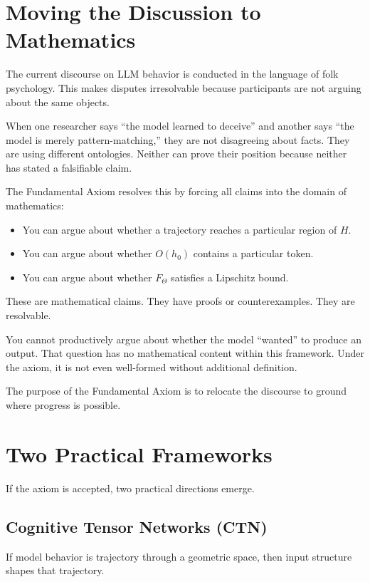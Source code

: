 \documentclass[11pt,a4paper]{article}
\begin{document}
\section{Moving the Discussion to Mathematics}

The current discourse on LLM behavior is conducted in the language of folk psychology. This makes disputes irresolvable because participants are not arguing about the same objects.

When one researcher says ``the model learned to deceive'' and another says ``the model is merely pattern-matching,'' they are not disagreeing about facts. They are using different ontologies. Neither can prove their position because neither has stated a falsifiable claim.

The Fundamental Axiom resolves this by forcing all claims into the domain of mathematics:

\begin{itemize}
    \item You can argue about whether a trajectory reaches a particular region of $H$.
    \item You can argue about whether $O(h_0)$ contains a particular token.
    \item You can argue about whether $F_\Theta$ satisfies a Lipschitz bound.
\end{itemize}

These are mathematical claims. They have proofs or counterexamples. They are resolvable.

You cannot productively argue about whether the model ``wanted'' to produce an output. That question has no mathematical content within this framework. Under the axiom, it is not even well-formed without additional definition.

The purpose of the Fundamental Axiom is to relocate the discourse to ground where progress is possible.

\section{Two Practical Frameworks}

If the axiom is accepted, two practical directions emerge.

\subsection{Cognitive Tensor Networks (CTN)}

If model behavior is trajectory through a geometric space, then input structure shapes that trajectory.
\end{document}
